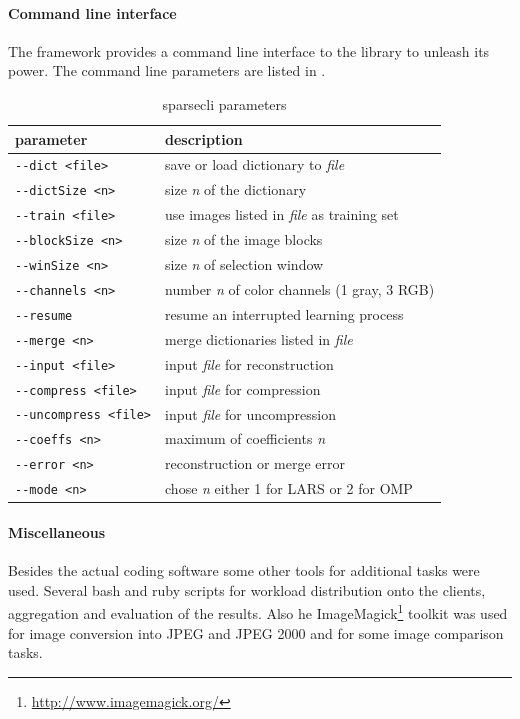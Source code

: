 \paragraph{Command line interface}
The framework provides a command line interface to the library to unleash its
power. The command line parameters are listed in .
%
\begin{table}[h]
\centering
\begin{tabular}{ |l | l |}
\hline
parameter & description \\
\hline
\verb+--dict <file>+ & save or load dictionary to \emph{file}\\
\verb+--dictSize <n>+ & size \emph{n} of the dictionary  \\
\verb+--train <file>+ & use images listed in \emph{file} as training set\\
\verb+--blockSize <n>+ & size \emph{n} of the image blocks \\
\verb+--winSize <n>+ & size \emph{n} of selection window \\
\verb+--channels <n>+ &number \emph{n} of color channels (1 gray, 3 RGB) \\

\verb+--resume+ & resume an interrupted learning process \\
\verb+--merge <n>+ & merge dictionaries listed in \emph{file}  \\
\verb+--input <file>+ & input \emph{file} for reconstruction \\
\verb+--compress <file>+ & input \emph{file} for compression \\
\verb+--uncompress <file>+ & input \emph{file} for uncompression \\
\verb+--coeffs <n>+ & maximum of coefficients \emph{n} \\
\verb+--error <n>+ & reconstruction or merge error \\
\verb+--mode <n>+ & chose \emph{n} either 1 for LARS or 2 for OMP \\
\hline
\end{tabular}
\caption{sparsecli parameters}\label{tab:cli}
\end{table}

\paragraph{Miscellaneous}
Besides the actual coding software some other tools for
additional tasks were used. Several bash and ruby scripts for workload
distribution onto the clients, aggregation and evaluation of the results.
Also he ImageMagick\footnote{\url{http://www.imagemagick.org/}} toolkit was used
for image conversion into JPEG and JPEG 2000 and for some image comparison
tasks.



